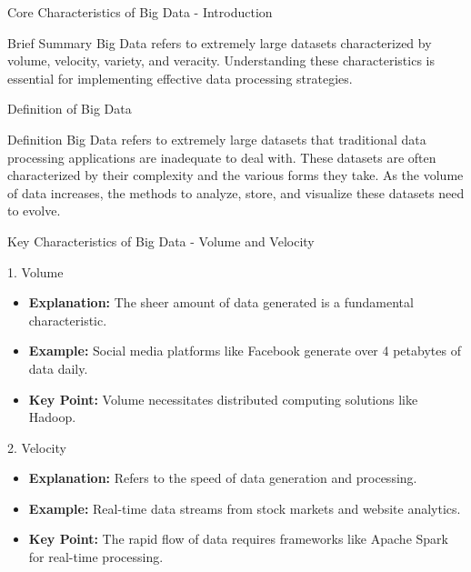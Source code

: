 \documentclass[aspectratio=169]{beamer}
\begin{document}
\begin{frame}[fragile]{Core Characteristics of Big Data - Introduction}
    \begin{block}{Brief Summary}
        Big Data refers to extremely large datasets characterized by volume, velocity, variety, and veracity. Understanding these characteristics is essential for implementing effective data processing strategies.
    \end{block}
\end{frame}

\begin{frame}[fragile]{Definition of Big Data}
    \begin{block}{Definition}
        Big Data refers to extremely large datasets that traditional data processing applications are inadequate to deal with. These datasets are often characterized by their complexity and the various forms they take. As the volume of data increases, the methods to analyze, store, and visualize these datasets need to evolve.
    \end{block}
\end{frame}

\begin{frame}[fragile]{Key Characteristics of Big Data - Volume and Velocity}
    \begin{block}{1. Volume}
        \begin{itemize}
            \item \textbf{Explanation:} The sheer amount of data generated is a fundamental characteristic.
            \item \textbf{Example:} Social media platforms like Facebook generate over 4 petabytes of data daily.
            \item \textbf{Key Point:} Volume necessitates distributed computing solutions like Hadoop.
        \end{itemize}
    \end{block}

    \begin{block}{2. Velocity}
        \begin{itemize}
            \item \textbf{Explanation:} Refers to the speed of data generation and processing.
            \item \textbf{Example:} Real-time data streams from stock markets and website analytics.
            \item \textbf{Key Point:} The rapid flow of data requires frameworks like Apache Spark for real-time processing.
        \end{itemize}
    \end{block}
\end{frame}
\end{document}
